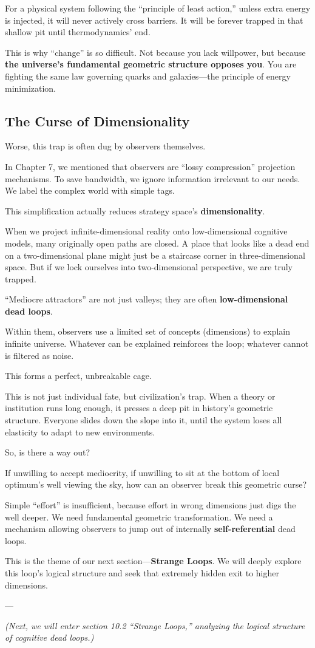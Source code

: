 For a physical system following the ``principle of least action,'' unless extra energy is injected, it will never actively cross barriers. It will be forever trapped in that shallow pit until thermodynamics' end.

This is why ``change'' is so difficult. Not because you lack willpower, but because \textbf{the universe's fundamental geometric structure opposes you}. You are fighting the same law governing quarks and galaxies---the principle of energy minimization.

\subsection{The Curse of Dimensionality}

Worse, this trap is often dug by observers themselves.

In Chapter 7, we mentioned that observers are ``lossy compression'' projection mechanisms. To save bandwidth, we ignore information irrelevant to our needs. We label the complex world with simple tags.

This simplification actually reduces strategy space's \textbf{dimensionality}.

When we project infinite-dimensional reality onto low-dimensional cognitive models, many originally open paths are closed. A place that looks like a dead end on a two-dimensional plane might just be a staircase corner in three-dimensional space. But if we lock ourselves into two-dimensional perspective, we are truly trapped.

``Mediocre attractors'' are not just valleys; they are often \textbf{low-dimensional dead loops}.

Within them, observers use a limited set of concepts (dimensions) to explain infinite universe. Whatever can be explained reinforces the loop; whatever cannot is filtered as noise.

This forms a perfect, unbreakable cage.

This is not just individual fate, but civilization's trap. When a theory or institution runs long enough, it presses a deep pit in history's geometric structure. Everyone slides down the slope into it, until the system loses all elasticity to adapt to new environments.

So, is there a way out?

If unwilling to accept mediocrity, if unwilling to sit at the bottom of local optimum's well viewing the sky, how can an observer break this geometric curse?

Simple ``effort'' is insufficient, because effort in wrong dimensions just digs the well deeper. We need fundamental geometric transformation. We need a mechanism allowing observers to jump out of internally \textbf{self-referential} dead loops.

This is the theme of our next section---\textbf{Strange Loops}. We will deeply explore this loop's logical structure and seek that extremely hidden exit to higher dimensions.

---

\textit{(Next, we will enter section 10.2 ``Strange Loops,'' analyzing the logical structure of cognitive dead loops.)}

